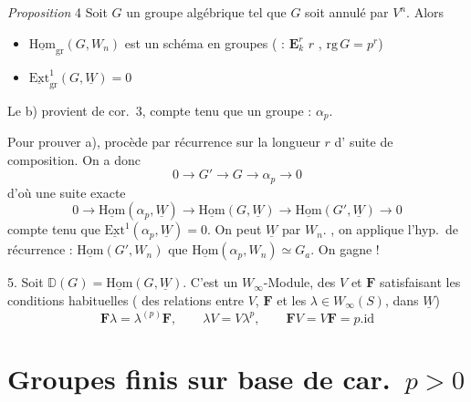 \documentclass[11pt,a4paper]{article}
\begin{document}
\emph{Proposition} 4 \quad Soit $G$ un groupe algébrique \struck{\ill{}}
\add{\ill{}} \ill{} \ill{} \ill{}  tel
que $G$ soit annulé par $V^n$. Alors
\begin{itemize}
  \item[a)] $\underline{\mathrm{Hom}}_{\mathrm{gr}}(G,W_n)$ est un schéma en
  groupes \struck{\ill{}}  \struck{\ill{} \ill{}}
   (  :
  $\mathbf{E}^r_k$ \ill{} $r$ \struck{\ill{} \ill{}}, $\mathrm{rg}\,G=p^r$)
  \item[b)] $\underline{\mathrm{Ext}}^1_{\mathrm{gr}}(G,\underline{W})=0$
\end{itemize}

Le b) provient de cor.~3, compte tenu que \ill{} \ill{} un groupe \ill{} :
$\alpha_p$.

Pour prouver a), \ill{} procède par récurrence sur la longueur $r$
d' suite de composition. On a donc
\[
  0\to G'\to G\to\alpha_p\to 0
\]
d'où une suite exacte
\[
  0\to\underline{\mathrm{Hom}}(\alpha_p,\underline{W})\to
  \underline{\mathrm{Hom}}(G,\underline{W})\to
  \underline{\mathrm{Hom}}(G',\underline{W})\to 0
\]
compte tenu que $\underline{\mathrm{Ext}}^1(\alpha_p,\underline{W})=0$. On
peut \ill{} \ill{} \ill{} \ill{} $\underline{W}$ par $W_n$. \ill{} \ill{},
on applique l'hyp.\ de récurrence : $\underline{\mathrm{Hom}}(G',W_n)$
\ill{} \ill{} \ill{} que
$\underline{\mathrm{Hom}}(\alpha_p,W_n)\simeq G_a$. On gagne !

5. Soit $\mathbb{D}(G)=\underline{\mathrm{Hom}}(G,\underline{W})$. C'est un
$W_\infty$-Module, \ill{} \ill{} des \ill{} $V$ et $\mathbf{F}$
satisfaisant les conditions habituelles ( des
relations entre $V$, $\mathbf{F}$ et les $\lambda\in W_\infty(S)$,
 dans $\underline{W}$)
\[
  \mathbf{F}\lambda=\lambda^{(p)}\mathbf{F},\qquad
  \lambda V=V\lambda^{p},\qquad
  \mathbf{F}V=V\mathbf{F}=p.\mathrm{id}
  \tag{5.1}
\]

\section*{Groupes finis sur base de car.\ $p>0$}
\end{document}
